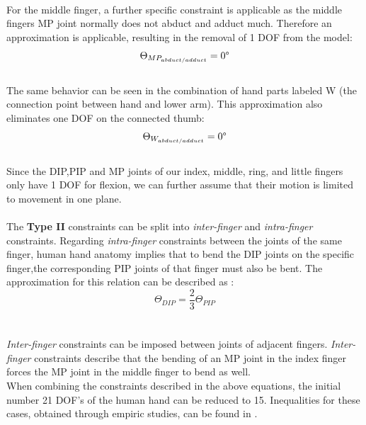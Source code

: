 \\For the middle finger, a further specific constraint is applicable as the middle fingers MP joint normally does not abduct and adduct much. Therefore an approximation is applicable, resulting in the removal of 1 DOF from the model:\\
\begin{equation}
\Theta _{MP_{abduct/adduct}}=0\degree
\end{equation}
\\The same behavior can be seen in the combination of hand parts labeled W (the connection point between hand and lower arm). This approximation also eliminates one DOF on the connected thumb:\\
\begin{equation}
\Theta _{W_{abduct/adduct}}=0\degree
\end{equation}
\\Since the DIP,PIP and MP joints of our index, middle, ring, and little fingers only have 1 DOF for flexion, we can further assume that their motion is limited to movement in one plane. \\\\
The \textbf{Type II} constraints can be split into \textit{inter-finger} and\textit{ intra-finger} constraints.
Regarding \textit{intra-finger} constraints between the joints of the same finger, human hand anatomy implies that to bend the DIP joints on the specific finger,the corresponding PIP joints of that finger must also be bent.
The approximation for this relation \cite{Rijpkema.1991} can be described as :\\
\begin{equation}
\Theta _{DIP} =\frac{2}{3}\Theta _{PIP}
\end{equation}\\
\\\textit{Inter-finger} constraints can be imposed between joints of adjacent fingers. \textit{Inter-finger} constraints describe that the bending of an MP joint in the index finger forces the MP joint in the middle finger to bend as well.\\
 When combining the constraints described in the above equations, the initial number 21 DOF's of the human hand can be reduced to 15. Inequalities for these cases, obtained through empiric studies, can be found in \citep{LEE.1995}.\\
